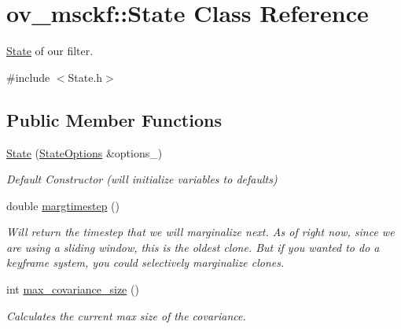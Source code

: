 \hypertarget{classov__msckf_1_1State}{}\section{ov\+\_\+msckf\+:\+:State Class Reference}
\label{classov__msckf_1_1State}


\hyperlink{classov__msckf_1_1State}{State} of our filter.  




{\ttfamily \#include $<$State.\+h$>$}

\subsection*{Public Member Functions}
\begin{DoxyCompactItemize}
\item 
\hyperlink{classov__msckf_1_1State_ad6098accfeb57e7eb8c8a22bfd45ec0b}{State} (\hyperlink{structov__msckf_1_1StateOptions}{State\+Options} \&options\+\_\+)
\begin{DoxyCompactList}\small\item\em Default Constructor (will initialize variables to defaults) \end{DoxyCompactList}\item 
double \hyperlink{classov__msckf_1_1State_a36420e71ffa54625667eac2a8a345582}{margtimestep} ()
\begin{DoxyCompactList}\small\item\em Will return the timestep that we will marginalize next. As of right now, since we are using a sliding window, this is the oldest clone. But if you wanted to do a keyframe system, you could selectively marginalize clones. \end{DoxyCompactList}\item 
int \hyperlink{classov__msckf_1_1State_a37c45cc1d3d1a3dcc46d3799a997355f}{max\+\_\+covariance\+\_\+size} ()
\begin{DoxyCompactList}\small\item\em Calculates the current max size of the covariance. \end{DoxyCompactList}\end{DoxyCompactItemize}
